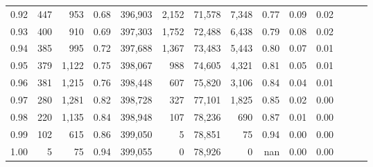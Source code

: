 \begin{tabular}{rrrrrrrrrrrrrr}
0.92 &    447 &    953 &  0.68 &  396,903 &    2,152 &  71,578 &   7,348 &  0.77 &  0.09 &      0.02 \\
0.93 &    400 &    910 &  0.69 &  397,303 &    1,752 &  72,488 &   6,438 &  0.79 &  0.08 &      0.02 \\
0.94 &    385 &    995 &  0.72 &  397,688 &    1,367 &  73,483 &   5,443 &  0.80 &  0.07 &      0.01 \\
0.95 &    379 &  1,122 &  0.75 &  398,067 &      988 &  74,605 &   4,321 &  0.81 &  0.05 &      0.01 \\
0.96 &    381 &  1,215 &  0.76 &  398,448 &      607 &  75,820 &   3,106 &  0.84 &  0.04 &      0.01 \\
0.97 &    280 &  1,281 &  0.82 &  398,728 &      327 &  77,101 &   1,825 &  0.85 &  0.02 &      0.00 \\
0.98 &    220 &  1,135 &  0.84 &  398,948 &      107 &  78,236 &     690 &  0.87 &  0.01 &      0.00 \\
0.99 &    102 &    615 &  0.86 &  399,050 &        5 &  78,851 &      75 &  0.94 &  0.00 &      0.00 \\
1.00 &      5 &     75 &  0.94 &  399,055 &        0 &  78,926 &       0 &   nan &  0.00 &      0.00 \\
\bottomrule
\end{tabular}
